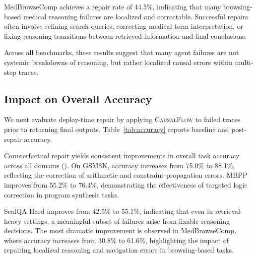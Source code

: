 \documentclass{article}
\theoremstyle{plain}
\theoremstyle{definition}
\theoremstyle{remark}
\begin{document}
MedBrowseComp achieves a repair rate of 44.5\%, indicating that many browsing-based medical reasoning failures are localized and correctable. Successful repairs often involve refining search queries, correcting medical term interpretation, or fixing reasoning transitions between retrieved information and final conclusions.

Across all benchmarks, these results suggest that many agent failures are not systemic breakdowns of reasoning, but rather localized causal errors within multi-step traces.

\subsection{Impact on Overall Accuracy}

We next evaluate deploy-time repair by applying \textsc{CausalFlow} to failed traces prior to returning final outputs. Table~\ref{tab:accuracy} reports baseline and post-repair accuracy.

\begin{table}[t]
\caption{Baseline agent accuracy vs accuracy after inference-time counterfactual repair using CausalFlow. Post-repair accuracy reflects applying graph-consistent causal intervention to failed traces without modifying model parameters. Structured step-level repair yields consistent improvements across domains.}
\label{tab:accuracy}
\centering
{}
\end{table}

Counterfactual repair yields consistent improvements in overall task accuracy across all domains (). On GSM8K, accuracy increases from 75.0\% to 88.1\%, reflecting the correction of arithmetic and constraint-propagation errors. MBPP improves from 55.2\% to 76.4\%, demonstrating the effectiveness of targeted logic correction in program synthesis tasks.

SealQA Hard improves from 42.5\% to 55.1\%, indicating that even in retrieval-heavy settings, a meaningful subset of failures arise from fixable reasoning decisions. The most dramatic improvement is observed in MedBrowseComp, where accuracy increases from 30.8\% to 61.6\%, highlighting the impact of repairing localized reasoning and navigation errors in browsing-based tasks.
\end{document}
